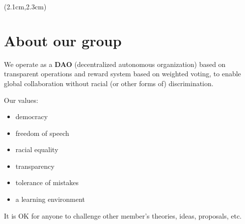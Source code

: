 \begin{preview}
\begin{textblock*}{5cm}(2.1cm,2.3cm) %
	{\color{red}{\large \textcircled{\small \themypage}}}
	\addtocounter{mypage}{1}
\end{textblock*}

\begin{minipage}{\textwidth}
	\setlength{\parskip}{0.4\baselineskip}

\section{About our group}

We operate as a \textbf{DAO} (decentralized autonomous organization) based on transparent operations and reward system based on weighted voting, to enable global collaboration without racial (or other forms of) discrimination.

Our values:
\begin{itemize}
	\item democracy
	\item freedom of speech
	\item racial equality
	\item transparency
	\item tolerance of mistakes
	\item a learning environment
\end{itemize}

It is OK for anyone to challenge other member's theories, ideas, proposals, etc.

\end{minipage}
\end{preview}


